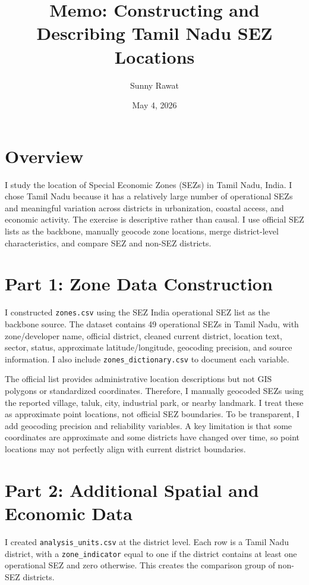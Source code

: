 \documentclass[10.5pt]{article}
\title{Memo: Constructing and Describing Tamil Nadu SEZ Locations}
\author{Sunny Rawat}
\date{May 4, 2026}
\begin{document}
\maketitle

\section*{Overview}

I study the location of Special Economic Zones (SEZs) in Tamil Nadu, India. I chose Tamil Nadu because it has a relatively large number of operational SEZs and meaningful variation across districts in urbanization, coastal access, and economic activity. The exercise is descriptive rather than causal. I use official SEZ lists as the backbone, manually geocode zone locations, merge district-level characteristics, and compare SEZ and non-SEZ districts.

\section*{Part 1: Zone Data Construction}

I constructed \texttt{zones.csv} using the SEZ India operational SEZ list as the backbone source. The dataset contains 49 operational SEZs in Tamil Nadu, with zone/developer name, official district, cleaned current district, location text, sector, status, approximate latitude/longitude, geocoding precision, and source information. I also include \texttt{zones\_dictionary.csv} to document each variable.

The official list provides administrative location descriptions but not GIS polygons or standardized coordinates. Therefore, I manually geocoded SEZs using the reported village, taluk, city, industrial park, or nearby landmark. I treat these as approximate point locations, not official SEZ boundaries. To be transparent, I add geocoding precision and reliability variables. A key limitation is that some coordinates are approximate and some districts have changed over time, so point locations may not perfectly align with current district boundaries.

\section*{Part 2: Additional Spatial and Economic Data}

I created \texttt{analysis\_units.csv} at the district level. Each row is a Tamil Nadu district, with a \texttt{zone\_indicator} equal to one if the district contains at least one operational SEZ and zero otherwise. This creates the comparison group of non-SEZ districts.
\end{document}
